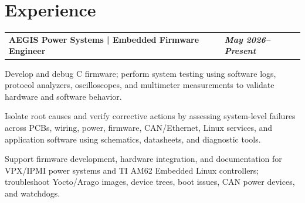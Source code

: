 \documentclass[10pt,letterpaper]{article}
\makeatletter
\newcommand{\resumeentry}[2]{%
  \begin{tabularx}{\textwidth}{@{}X>{\raggedleft\arraybackslash}p{2.40in}@{}}
    \textbf{#1} & \textbf{\textit{#2}}
  \end{tabularx}\vspace{-0.075cm}
}
\makeatother
\begin{document}
\section{Experience}
\resumeentry{AEGIS Power Systems | Embedded Firmware Engineer}{May 2026--Present}
\begin{resumebullets}
  \item Develop and debug C firmware; perform system testing using software logs, protocol analyzers, oscilloscopes, and multimeter measurements to validate hardware and software behavior.
  \item Isolate root causes and verify corrective actions by assessing system-level failures across PCBs, wiring, power, firmware, CAN/Ethernet, Linux services, and application software using schematics, datasheets, and diagnostic tools.
  \item Support firmware development, hardware integration, and documentation for VPX/IPMI power systems and TI AM62 Embedded Linux controllers; troubleshoot Yocto/Arago images, device trees, boot issues, CAN power devices, and watchdogs.
\end{resumebullets}
\end{document}

